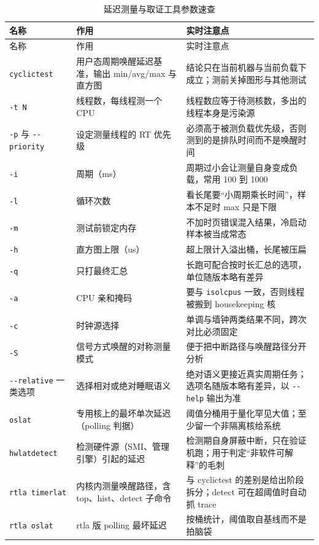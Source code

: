 \documentclass[12pt,a4paper,fontset=fandol]{ctexbook}
\newcommand{\Tp}[1]{\texttt{#1}}
\newcommand{\Opt}[1]{\texttt{-\/-#1}}
\begin{document}
\begin{longtable}{>{\raggedright\arraybackslash\footnotesize}p{} >{\raggedright\arraybackslash\footnotesize}p{} >{\raggedright\arraybackslash\footnotesize}p{}}
\caption{延迟测量与取证工具参数速查}\label{tab:apB-tools} \\
\toprule 名称 & 作用 & 实时注意点 \\ \midrule
\endfirsthead
\toprule 名称 & 作用 & 实时注意点 \\ \midrule
\endhead
\bottomrule \endfoot
\endlastfoot
\Tp{cyclictest} & 用户态周期唤醒延迟基准，输出 min/avg/max 与直方图 & 结论只在当前机器与当前负载下成立；测前关掉图形与其他测试 \\
\Tp{-t N} & 线程数，每线程测一个 CPU & 线程数应等于待测核数，多出的线程本身是污染源 \\
\Tp{-p} 与 \Opt{priority} & 设定测量线程的 RT 优先级 & 必须高于被测负载优先级，否则测到的是排队时间而不是唤醒时间 \\
\Tp{-i} & 周期（ms） & 周期过小会让测量自身变成负载，常用 100 到 1000 \\
\Tp{-l} & 循环次数 & 看长尾要``小周期乘长时间''，样本不足时 max 只是下限 \\
\Tp{-m} & 测试前锁定内存 & 不加时页错误混入结果，冷启动样本被当成常态 \\
\Tp{-h} & 直方图上限（us） & 超上限计入溢出桶，长尾被压扁 \\
\Tp{-q} & 只打最终汇总 & 长跑可配合按时长汇总的选项，单位随版本略有差异 \\
\Tp{-a} & CPU 亲和掩码 & 要与 \Tp{isolcpus} 一致，否则线程被搬到 housekeeping 核 \\
\Tp{-c} & 时钟源选择 & 单调与墙钟两类结果不同，跨次对比必须固定 \\
\Tp{-S} & 信号方式唤醒的对称测量模式 & 便于把中断路径与唤醒路径分开分析 \\
\Opt{relative} 一类选项 & 选择相对或绝对睡眠语义 & 绝对语义更接近真实周期任务；选项名随版本略有差异，以 \Opt{help} 输出为准 \\
\Tp{oslat} & 专用核上的最坏单次延迟（polling 判据） & 阈值分桶用于量化罕见大值；至少留一个非隔离核给系统 \\
\Tp{hwlatdetect} & 检测硬件源（SMI、管理引擎）引起的延迟 & 检测期自身屏蔽中断，只在验证机跑；用于判定``非软件可解释''的毛刺 \\
\Tp{rtla timerlat} & 内核内测量唤醒路径，含 top、hist、detect 子命令 & 与 cyclictest 的差别是给出阶段拆分；detect 可在超阈值时自动抓 trace \\
\Tp{rtla oslat} & rtla 版 polling 最坏延迟 & 按桶统计，阈值取自基线而不是拍脑袋 \\

\end{longtable}
\end{document}
